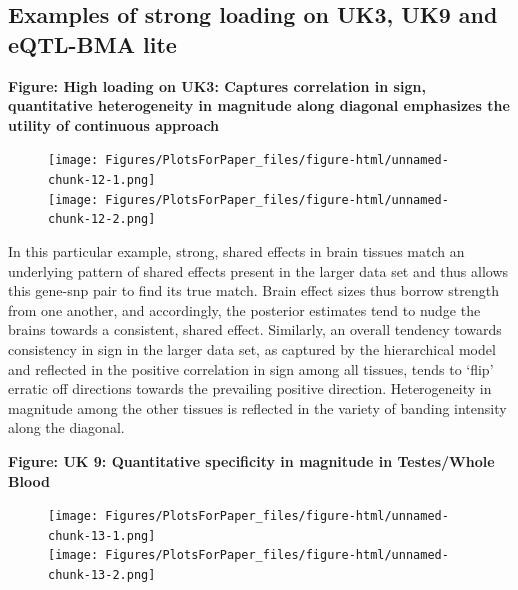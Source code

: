 \subsection{Examples of strong loading on UK3, UK9 and eQTL-BMA lite}

\newline
\textbf{Figure: High loading on UK3: Captures correlation in sign, quantitative heterogeneity in magnitude along diagonal emphasizes the utility of continuous approach}
\newline
\begin{figure}[htbp]
\texttt{[image: Figures/PlotsForPaper\_files/figure-html/unnamed-chunk-12-1.png]}\\
\texttt{[image: Figures/PlotsForPaper\_files/figure-html/unnamed-chunk-12-2.png]}
\end{figure}\newline


In this particular example, strong, shared effects in brain tissues match an underlying pattern of shared effects present in the larger data set and thus allows this gene-snp pair to find its true match. Brain effect sizes thus borrow strength from one another, and accordingly, the posterior estimates tend to nudge the brains towards a consistent, shared effect. Similarly, an overall tendency towards consistency in sign in the larger data set, as captured by the hierarchical model and reflected in the positive correlation in sign among all tissues, tends to `flip' erratic off directions towards the prevailing positive direction. Heterogeneity in magnitude among the other tissues is reflected in the variety of banding intensity along the diagonal.\newline


\textbf{Figure: UK 9: Quantitative specificity in magnitude in Testes/Whole Blood}
\newline
\begin{figure}[htbp]
\texttt{[image: Figures/PlotsForPaper\_files/figure-html/unnamed-chunk-13-1.png]}\\
\texttt{[image: Figures/PlotsForPaper\_files/figure-html/unnamed-chunk-13-2.png]}
\end{figure}\newline


